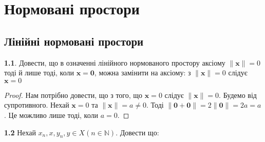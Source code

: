 \documentclass[a4paper,12pt,twoside]{book}
\begin{document}
\chapter{Нормовані простори}
\section{Лінійні нормовані простори}
\textbf{1.1}. Довести, що в означенні лінійного нормованого простору аксіому $\|\mathbf{x}\| = 0$ тоді й лише тоді, коли $\mathbf{x} = \mathbf{0}$, можна замінити на аксіому: з $\|\mathbf{x}\| = 0$ слідує $\mathbf{x} = 0$
\begin{proof}
    Нам потрібно довести, що з того, що $\mathbf{x} = 0$ слідує $\|\mathbf{x}\| = 0$. Будемо від супротивного. Нехай $\mathbf{x} = 0$ та $\|\mathbf{x}\| = a \neq 0$. Тоді $\|\mathbf{0} + \mathbf{0}\| = 2\|\mathbf{0}\|  = 2a = a $. Це можливо лише тоді, коли $a = 0$.
\end{proof}
\textbf{1.2} Нехай $x_n, x, y_n, y \in X (n \in \mathbb{N})$. Довести що:
\end{document}
